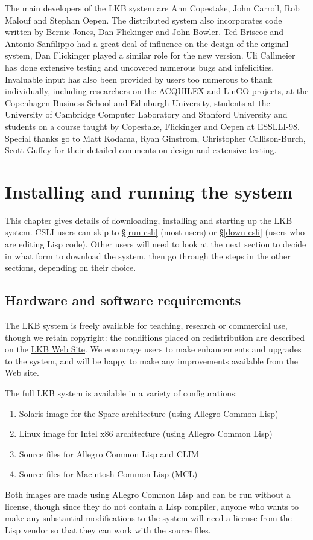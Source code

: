 \documentclass[12pt]{report}
\begin{document}
The main developers of the LKB system 
are Ann Copestake, John Carroll, Rob Malouf and Stephan Oepen.  
The distributed system also incorporates code
written by Bernie Jones, Dan Flickinger and   
John Bowler.  Ted Briscoe and Antonio Sanfilippo had a great 
deal of influence on the design of the original system,
Dan Flickinger played a similar role for the new version.
Uli Callmeier has done extensive testing and uncovered numerous
bugs and infelicities.
Invaluable input has also
been provided by users too numerous to thank individually, including
researchers on the ACQUILEX and LinGO projects, at
the Copenhagen Business School and Edinburgh University,
students
at the University of Cambridge Computer Laboratory and
Stanford University and students on a course taught by Copestake, Flickinger
and Oepen at ESSLLI-98.  Special thanks go to
Matt Kodama, Ryan Ginstrom, Christopher Callison-Burch, Scott Guffey
for their detailed comments on design and extensive testing.


\chapter{Installing and running the system}
\label{installation}

This chapter gives details of downloading, installing and 
starting up the LKB system.
CSLI users can skip to \S\ref{run-csli} (most users) or \S\ref{down-csli}
(users who are editing Lisp code).
Other users will need to look at the next section to decide in
what form to download the system, then go through the steps in the
other sections, depending on their 
choice.

\section{Hardware and software requirements}
\label{require}

The LKB system is freely available for teaching, research or commercial use,
though we retain copyright:
the conditions placed on redistribution are described on the 
\href{http://www-csli.stanford.edu/~aac/lkb.html}{LKB Web Site}.
We encourage users to make enhancements and upgrades to the system,
and will be happy to make any improvements available from the Web site.

The full LKB system is available in a variety of configurations:
\begin{enumerate}
\item Solaris image for the Sparc architecture (using Allegro Common Lisp)
\item Linux image for Intel x86 architecture (using Allegro Common Lisp)
\item Source files for Allegro Common Lisp and CLIM
\item Source files for Macintosh Common Lisp (MCL)
\end{enumerate}
Both images are made using Allegro Common Lisp and
can be run without a license, though since they do not contain
a Lisp compiler, anyone who wants to make any substantial
modifications to the
system will need a license from the Lisp vendor
so that they can work with the source files.
\end{document}
